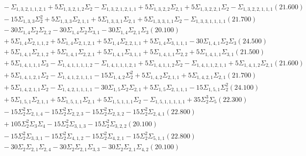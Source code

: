 \documentclass[12pt]{article}
\begin{document}
\begin{landscape}
\begin{align*}
		&\quad\quad -\Sigma_{1,3,2,1,1,2,1}+5\Sigma_{1,3,2,1,2}\Sigma_{2}-\Sigma_{1,3,2,1,2,1,1}+5\Sigma_{1,3,2,2}\Sigma_{2,1}+5\Sigma_{1,3,2,2,1}\Sigma_{2}-\Sigma_{1,3,2,2,1,1,1}(21.600) \\ 
		&\quad\quad -15\Sigma_{1,3,3}\Sigma_{2}^{2}+5\Sigma_{1,3,3}\Sigma_{2,1,1}+5\Sigma_{1,3,3,1}\Sigma_{2,1}+5\Sigma_{1,3,3,1,1}\Sigma_{2}-\Sigma_{1,3,3,1,1,1,1}(21.700) \\ 
		&\quad\quad -30\Sigma_{1,4}\Sigma_{2}\Sigma_{2,2}-30\Sigma_{1,4}\Sigma_{2}\Sigma_{3,1}-30\Sigma_{1,4}\Sigma_{2,1}\Sigma_{3}(20.100) \\ 
		&\quad\quad +5\Sigma_{1,4}\Sigma_{2,1,1,2}+5\Sigma_{1,4}\Sigma_{2,1,2,1}+5\Sigma_{1,4}\Sigma_{2,2,1,1}+5\Sigma_{1,4}\Sigma_{3,1,1,1}-30\Sigma_{1,4,1}\Sigma_{2}\Sigma_{3}(24.500) \\ 
		&\quad\quad +5\Sigma_{1,4,1}\Sigma_{2,1,2}+5\Sigma_{1,4,1}\Sigma_{2,2,1}+5\Sigma_{1,4,1}\Sigma_{3,1,1}+5\Sigma_{1,4,1,1}\Sigma_{2,2}+5\Sigma_{1,4,1,1}\Sigma_{3,1}(21.500) \\ 
		&\quad\quad +5\Sigma_{1,4,1,1,1}\Sigma_{3}-\Sigma_{1,4,1,1,1,1,2}-\Sigma_{1,4,1,1,1,2,1}+5\Sigma_{1,4,1,1,2}\Sigma_{2}-\Sigma_{1,4,1,1,2,1,1}+5\Sigma_{1,4,1,2}\Sigma_{2,1}(21.600) \\ 
		&\quad\quad +5\Sigma_{1,4,1,2,1}\Sigma_{2}-\Sigma_{1,4,1,2,1,1,1}-15\Sigma_{1,4,2}\Sigma_{2}^{2}+5\Sigma_{1,4,2}\Sigma_{2,1,1}+5\Sigma_{1,4,2,1}\Sigma_{2,1}(21.700) \\ 
		&\quad\quad +5\Sigma_{1,4,2,1,1}\Sigma_{2}-\Sigma_{1,4,2,1,1,1,1}-30\Sigma_{1,5}\Sigma_{2}\Sigma_{2,1}+5\Sigma_{1,5}\Sigma_{2,1,1,1}-15\Sigma_{1,5,1}\Sigma_{2}^{2}(24.100) \\ 
		&\quad\quad +5\Sigma_{1,5,1}\Sigma_{2,1,1}+5\Sigma_{1,5,1,1}\Sigma_{2,1}+5\Sigma_{1,5,1,1,1}\Sigma_{2}-\Sigma_{1,5,1,1,1,1,1}+35\Sigma_{2}^{3}\Sigma_{5}(22.300) \\ 
		&\quad\quad -15\Sigma_{2}^{2}\Sigma_{2,1,4}-15\Sigma_{2}^{2}\Sigma_{2,2,3}-15\Sigma_{2}^{2}\Sigma_{2,3,2}-15\Sigma_{2}^{2}\Sigma_{2,4,1}(22.800) \\ 
		&\quad\quad +105\Sigma_{2}^{2}\Sigma_{3}\Sigma_{4}-15\Sigma_{2}^{2}\Sigma_{3,1,3}-15\Sigma_{2}^{2}\Sigma_{3,2,2}(20.100) \\ 
		&\quad\quad -15\Sigma_{2}^{2}\Sigma_{3,3,1}-15\Sigma_{2}^{2}\Sigma_{4,1,2}-15\Sigma_{2}^{2}\Sigma_{4,2,1}-15\Sigma_{2}^{2}\Sigma_{5,1,1}(22.800) \\ 
		&\quad\quad -30\Sigma_{2}\Sigma_{2,1}\Sigma_{2,4}-30\Sigma_{2}\Sigma_{2,1}\Sigma_{3,3}-30\Sigma_{2}\Sigma_{2,1}\Sigma_{4,2}(20.100) \\ 

\end{align*}
\end{landscape}
\end{document}
